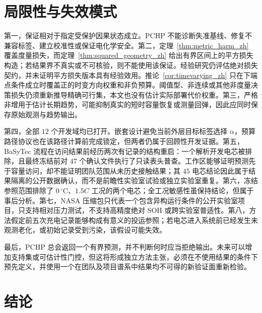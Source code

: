 \documentclass[UTF8,11pt]{ctexart}
\begin{document}
\section{局限性与失效模式}

第一，保证相对于指定受保护因果状态成立。PCHP 不能诊断失准基线、修复不兼容标签、建立校准性或保证电化学安全。第二，定理~\ref{thm:metric_harm_zh} 覆盖度量损失，而定理~\ref{thm:squared_geometry_zh} 给出有界区间上的平方损失构造；若结果界不真实或不可核验，则不能使用该保证。经验研究仍评估绝对损失契约，并未证明平方损失版本具有经验效用。推论~\ref{cor:timevarying_zh} 只在下端点条件成立时覆盖正的时变方向权重和非负预算。阈值型、非连续或其他非度量决策损失仍须重新推导精确可行集，本文也没有估计实际部署代价权重。第三，严格非增用于估计长期趋势，可能抑制真实的短时容量恢复或测量回弹，因此应同时保存原始观测与趋势输出。

第四，全部 $12$ 个开发域均已打开。嵌套设计避免当前外层目标标签选择 $\alpha$，预算路径协议也在该路径计算前完成锁定，但两者仍属于回顾性开发证据。第五，BaSyTec 流程在访问结果前经历两次有记录的结构重启：一个解析开发电芯被排除，且最终冻结前对 $47$ 个确认文件执行了只读表头普查。工作区能够证明预测先于容量访问，却不能证明团队范围从未历史接触结果；其 $45$ 电芯结论因此属于结果隔离的公开数据确认，而不是前瞻性实验室试验或独立实验室重复。第六，冻结参照范围排除了 $0\,^{\circ}\mathrm{C}$、$1.5C$ 工况的两个电芯；全工况敏感性虽保持结论，但属于事后分析。第七，NASA 压缩包只代表一个包含异构运行条件的公开实验室项目，只支持相对压力测试，不支持高精度绝对 SOH 或跨实验室普适性。第八，方法假定前五次充电记录能够构成有意义的投运参照；若电芯进入系统前已经发生未观测老化，或初始记录受到污染，该假设可能失效。

最后，PCHP 总会返回一个有界预测，并不判断何时应当拒绝输出。未来可以增加支持集或可估计性门控，但这将形成独立方法主张，必须在不使用结果的条件下预先定义，并使用一个在团队及项目谱系中结果均不可得的新验证面重新检验。

\section{结论}
\end{document}
